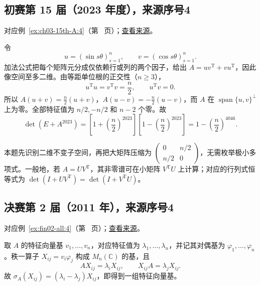 \documentclass[12pt,fontset=fandol]{ctexart}
\begin{document}
\subsection{初赛第 15 届（2023 年度），来源序号4}\label{ans:ch03-15th-A:4}\label{pr:ch03-15th-A:4}

对应例~\ref{ex:ch03-15th-A:4}（第~\pageref{ex:ch03-15th-A:4} 页）；\href{https://github.com/lzxcr/cmc-mathematics/blob/64916fa1fdbc3e444a652eca204d5669058ee321/src/problems/preliminary/15/04.md}{查看来源}。

\begin{solve}

令
\[
u=(\sin s\theta)_{s=1}^n,\qquad v=(\cos s\theta)_{s=1}^n.
\]
加法公式把每个矩阵元分成仅依赖行或列的两个因子，给出 $A=uv^{\mathrm T}+vu^{\mathrm T}$，因此像空间至多二维。由等距单位根的正交性（$n\geq3$），
\[
u^{\mathrm T}u=v^{\mathrm T}v=\frac n2,
\qquad u^{\mathrm T}v=0.
\]
所以 $A(u+v)=\tfrac n2(u+v)$，$A(u-v)=-\tfrac n2(u-v)$，而 $A$ 在 $\operatorname{span}\{u,v\}^{\perp}$ 上为零。全部特征值为 $n/2,-n/2$ 和 $n-2$ 个零。故
\[
\det(E+A^{2023})
=\left[1+\left(\frac n2\right)^{2023}\right]
 \left[1-\left(\frac n2\right)^{2023}\right]
=1-\left(\frac n2\right)^{4046}.
\]

\end{solve}

\begin{remark}[方法与条件]

本题先识别二维不变子空间，再把大矩阵压缩为 $\begin{pmatrix}0&n/2\\n/2&0\end{pmatrix}$，无需枚举极小多项式。一般地，若 $A=UV^{\mathrm T}$，其非零谱可在小矩阵 $V^{\mathrm T}U$ 上计算；对应的行列式恒等式为 $\det(I+UV^{\mathrm T})=\det(I+V^{\mathrm T}U)$。

\end{remark}

\subsection{决赛第 2 届（2011 年），来源序号4}\label{ans:fin02-all:4}\label{pr:fin02-all:4}

对应例~\ref{ex:fin02-all:4}（第~\pageref{ex:fin02-all:4} 页）；\href{https://github.com/lzxcr/cmc-mathematics/blob/64916fa1fdbc3e444a652eca204d5669058ee321/src/problems/finals/02/04.md}{查看来源}。

\begin{solve}

取 $A$ 的特征向量基 $v_1,\ldots,v_n$，对应特征值为 $\lambda_1,\ldots,\lambda_n$，并记其对偶基为 $\varphi_1,\ldots,\varphi_n$。秩一算子
$X_{ij}=v_i\varphi_j$ 构成 $M_n(\mathbb C)$ 的基，且
\[
AX_{ij}=\lambda_iX_{ij},\qquad X_{ij}A=\lambda_jX_{ij}.
\]
故 $\sigma_A(X_{ij})=(\lambda_i-\lambda_j)X_{ij}$，即得到一组特征向量基。

\end{solve}
\end{document}
